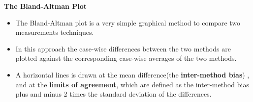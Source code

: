 \documentclass[compress]{beamer}        %
\makeatletter
\newcommand{\tcb}{\textcolor{beamer@blendedblue}}
\makeatother
\begin{document}
		\begin{frame}{\bf \tcb{The Bland-Altman Plot}}
			\Large
			\begin{itemize}\itemsep0.7cm
				
				\item The Bland-Altman plot \cite{BA86,BA99} is a very simple graphical method to compare two measurements techniques. \item In this approach the case-wise differences between the two methods are plotted against the corresponding case-wise averages of the two methods.
				
				\item A horizontal lines is drawn at the mean difference(the\textbf{ inter-method bias}) , and at the \textbf{limits of agreement}, which are defined as the inter-method bias plus and minus 2 times the standard deviation of the differences.
				
			\end{itemize}
		\end{frame}
		
\end{document}
